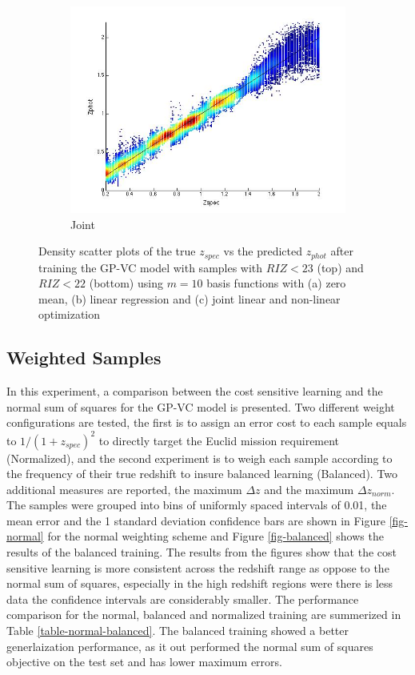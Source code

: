 \documentclass[useAMS,usenatbib,fleqn]{mn2e}
\begin{document}
\begin{figure}
\begin{subfigure}[b]{0.3\columnwidth}
                \includegraphics[trim = 35px 15px 50px 35px, clip=true,width=\textwidth]{22_J.jpg}
                \caption{Joint}
        \end{subfigure}
        
        \caption{Density scatter plots of the true $z_{spec}$ vs the predicted $z_{phot}$ after training the GP-VC model with samples with $RIZ<23$ (top) and $RIZ<22$ (bottom) using $m=10$ basis functions with (a) zero mean, (b) linear regression and (c) joint linear and non-linear optimization}
        \label{fig-RIZ-splits}
\end{figure}


\subsection{Weighted Samples}
In this experiment, a comparison between the cost sensitive learning and the normal sum of squares for the GP-VC model is presented. Two different weight configurations are tested, the first is to assign an error cost to each sample equals to $1/\left(1+z_{spec}\right)^{2}$ to directly target the Euclid mission requirement (Normalized), and the second experiment is to weigh each sample according to the frequency of their true redshift to insure balanced learning (Balanced).  Two additional measures are reported, the maximum $\Delta z$ and the maximum $\Delta z_{norm}$. The samples were grouped into bins of uniformly spaced intervals of 0.01, the mean error and the 1 standard deviation confidence bars are shown in Figure \ref{fig-normal} for the normal weighting scheme and Figure \ref{fig-balanced} shows the results of the balanced training. The results from the figures show that the cost sensitive learning is more consistent across the redshift range as oppose to the normal sum of squares, especially in the high redshift regions were there is less data the confidence intervals are considerably smaller. The performance comparison for the normal, balanced and normalized training are summerized in Table \ref{table-normal-balanced}. The balanced training showed a better generlaization performance, as it out performed the normal sum of squares objective on the test set and has lower maximum errors.
\end{document}
